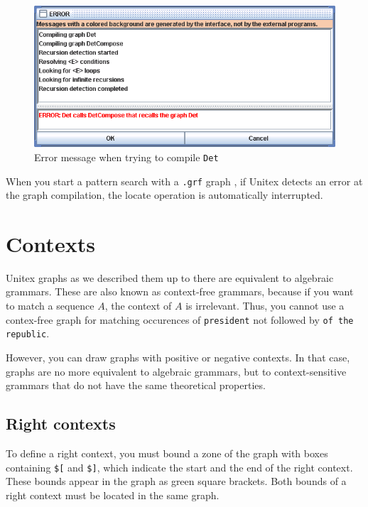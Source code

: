 \begin{figure}[!h]
\begin{center}
\includegraphics[width=15cm]{resources/img/fig6-11.png}
\caption{Error message when trying to compile
\texttt{Det}\label{fig-error-message}}
\end{center}
\end{figure}

\noindent When you start a pattern search with a \verb+.grf+
graph , if Unitex detects an error at the graph
compilation, the locate operation is automatically interrupted.


\section{Contexts}
\label{section-contexts}

Unitex graphs as we described them up to there are equivalent to algebraic
grammars. These are also known as context-free grammars, because if you want to
match a sequence $A$, the context of $A$ is irrelevant. Thus, you cannot use a
contex-free graph for matching occurences of \verb+president+ not followed by
\verb+of the republic+.

\bigskip
\noindent However, you can draw graphs with positive or negative contexts. In
that case, graphs are no more equivalent to algebraic grammars, but to context-sensitive
grammars that do not have the same theoretical properties.

\subsection{Right contexts}
\index{\verb+$[+}
\index{\verb+$]+}
To define a right context, you must bound a zone of the graph with boxes
containing \verb+$[+ and \verb+$]+, which indicate the start and the end of the
right context. These bounds appear in the graph as green square brackets. Both
bounds of a right context must be located in the same graph.

